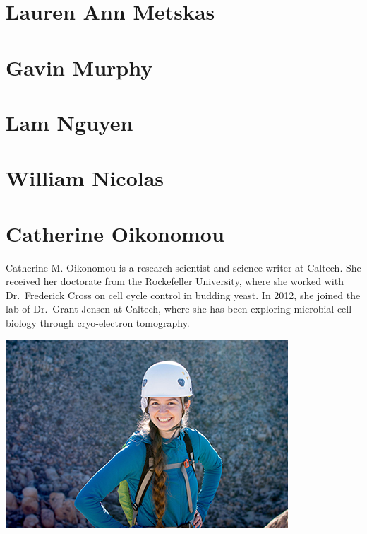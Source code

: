 \documentclass[]{tufte-book}
\begin{document}
\hypertarget{lauren_ann_metskas}{%
\section*{Lauren Ann Metskas}\label{lauren_ann_metskas}}

\hypertarget{gavin_murphy}{%
\section*{Gavin Murphy}\label{gavin_murphy}}

\hypertarget{lam_nguyen}{%
\section*{Lam Nguyen}\label{lam_nguyen}}

\hypertarget{william_nicolas}{%
\section*{William Nicolas}\label{william_nicolas}}

\hypertarget{catherine_oikonomou}{%
\section*{Catherine Oikonomou}\label{catherine_oikonomou}}

Catherine M. Oikonomou is a research scientist and science writer at Caltech. She received her doctorate from the Rockefeller University, where she worked with Dr.~Frederick Cross on cell cycle control in budding yeast. In 2012, she joined the lab of Dr.~Grant Jensen at Caltech, where she has been exploring microbial cell biology through cryo-electron tomography.

\includegraphics{img/bios/catherine_oikonomou}
\end{document}

